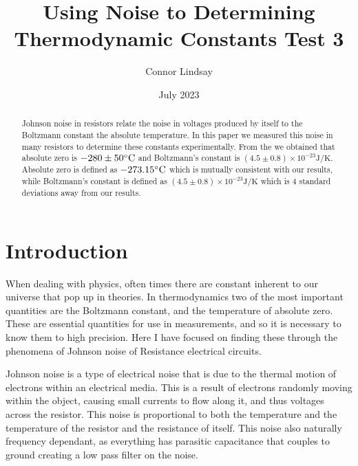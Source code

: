 \documentclass[aps,twocolumn,preprintnumbers]{revtex4}
\newcommand{\Joule}{\mathrm{J}}
\newcommand{\Celcius}{\degree \mathrm{C}}
\newcommand{\Kelvin}{\mathrm{K}}
\begin{document}
\title{Using Noise to Determining Thermodynamic Constants Test 3}

\author{Connor Lindsay}


\date{July 2023}

\begin{abstract}
    Johnson noise in resistors relate the noise in voltages produced by itself to the Boltzmann constant the absolute temperature. In this paper we measured this noise in many resistors to determine these constants experimentally. From the we obtained that absolute zero is $-280 \pm 50 \Celcius $ and Boltzmann's constant is $(4.5 \pm 0.8)\times 10^{-23} \Joule/\Kelvin$. Absolute zero is defined as $-273.15 \Celcius$ which is mutually consistent with our results, while Boltzmann's constant is defined as $(4.5 \pm 0.8)\times 10^{-23} \Joule/\Kelvin$ which is 4 standard deviations away from our results. 
\end{abstract}

\maketitle


\section{Introduction}

When dealing with physics, often times there are constant inherent to our universe that pop up in theories. In thermodynamics two of the most important quantities are the Boltzmann constant, and the temperature of absolute zero. These are essential quantities for use in measurements, and so it is necessary to know them to high precision. Here I have focused on finding these through the phenomena of Johnson noise of Resistance electrical circuits.  

Johnson noise is a type of electrical noise that is due to the thermal motion of electrons within an electrical media. This is a result of electrons randomly moving within the object, causing small currents to flow along it, and thus voltages across the resistor. This noise is proportional to both the temperature and the temperature of the resistor and the resistance of itself. This noise also naturally frequency dependant, as everything has parasitic capacitance that couples to ground creating a low pass filter on the noise.
\end{document}
